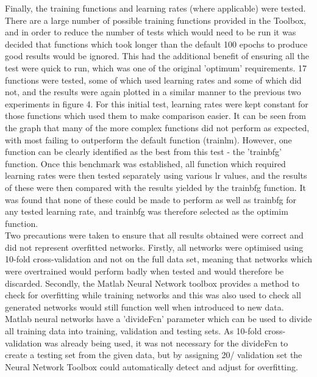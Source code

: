 \documentclass[a4paper]{article}
\begin{document}
Finally, the training functions and learning rates (where applicable) were tested. There are a large number of possible training functions
provided in the Toolbox, and in order to reduce the number of tests which would need to be run it was decided that functions which took longer
than the default 100 epochs to produce good results would be ignored. This had the additional benefit of ensuring all the test were quick to run,
which was one of the original 'optimum' requirements. 17 functions were tested, some of which used learning rates and some of which did not, and
the results were again plotted in a similar manner to the previous two experiments in figure 4. For this initial test, learning rates were kept
constant for those functions which used them to make comparison easier. It can be seen from the graph that many of the more complex functions
did not perform as expected, with most failing to outperform the default function (trainlm). However, one function can be clearly identified
as the best from this test - the 'trainbfg' function. Once this benchmark was established, all function which required learning rates were then
tested separately using various lr values, and the results of these were then compared with the results yielded by the trainbfg function.
It was found that none of these could be made to perform as well as trainbfg for any tested learning rate, and trainbfg was therefore selected
as the optimim function.\\ 

Two precautions were taken to ensure that all results obtained were correct and did not represent overfitted networks. Firstly, all networks were
optimised using 10-fold cross-validation and not on the full data set, meaning that networks which were overtrained would perform badly when tested
and would therefore be discarded. Secondly, the Matlab Neural Network toolbox provides a method to check for overfitting while training networks and
this was also used to check all generated networks would still function well when introduced to new data. Matlab neural networks have a 'divideFcn'
parameter which can be used to divide all training data into training, validation and testing sets. As 10-fold cross-validation was already being
used, it was not necessary for the divideFcn to create a testing set from the given data, but by assigning 20/%
validation set the Neural Network Toolbox could automatically detect and adjust for overfitting.\\ 

\end{document}
